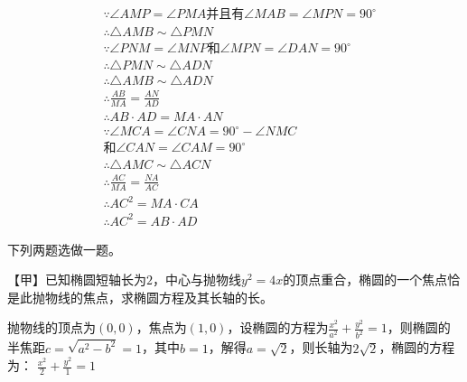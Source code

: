 \documentclass[answers]{exam}
\begin{document}
\begin{questions}
	\begin{solution}
		\begin{align*}
			 & \because \angle{AMP} = \angle{PMA} \text{并且有} \angle{MAB} = \angle{MPN} = 90^\circ \\
			 & \therefore \triangle{AMB} \sim \triangle{PMN}                                      \\
			 & \because \angle{PNM} = \angle{MNP} \text{和} \angle{MPN} = \angle{DAN} = 90^\circ   \\
			 & \therefore \triangle{PMN} \sim \triangle{ADN}                                      \\
			 & \therefore \triangle{AMB} \sim \triangle{ADN}                                      \\
			 & \therefore \frac{AB}{MA} = \frac{AN}{AD}                                           \\
			 & \therefore AB\cdot AD = MA \cdot AN                                                \\
			 & \because \angle{MCA} = \angle{CNA} = 90^\circ - \angle{NMC}                        \\
			 & \text{和} \angle{CAN} = \angle{CAM} = 90^\circ                                      \\
			 & \therefore \triangle{AMC} \sim \triangle{ACN}                                      \\
			 & \therefore \frac{AC}{MA} = \frac{NA}{AC}                                           \\
			 & \therefore AC^2 = MA \cdot CA                                                      \\
			 & \therefore AC^2 = AB \cdot AD
		\end{align*}
	\end{solution}
	\question 下列两题选做一题。

	【甲】已知椭圆短轴长为$2$，中心与抛物线$y^2=4x$的顶点重合，椭圆的一个焦点恰是此抛物线的焦点，求椭圆方程及其长轴的长。
	\begin{solution}
		抛物线的顶点为$(0,0)$，焦点为$(1, 0)$，设椭圆的方程为$\frac{x^2}{a^2} + \frac{y^2}{b^2} =
			1$，则椭圆的半焦距$c=\sqrt{a^2 - b^2} = 1$，其中$b=1$，解得$a=\sqrt{2}$，则长轴为$2\sqrt{2}$，椭圆的方程为：
		\( \frac{x^2}{2} + \frac{y^2}{1} = 1 \)
	\end{solution}


\end{questions}
\end{document}
